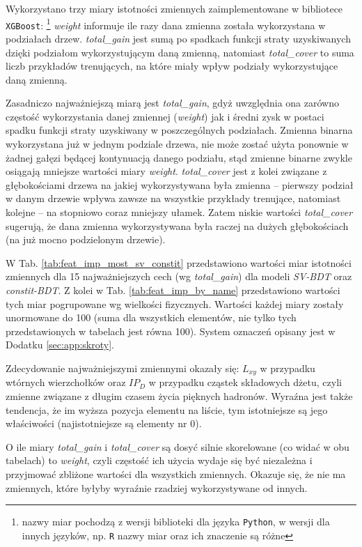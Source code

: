 Wykorzystano trzy miary istotności zmiennych zaimplementowane w bibliotece \texttt{XGBoost}: 
\footnote{nazwy miar pochodzą z wersji biblioteki dla języka \texttt{Python}, w wersji dla innych języków, np. \texttt{R} nazwy miar oraz ich znaczenie są różne} 
\textit{weight} informuje ile razy dana zmienna została wykorzystana w podziałach drzew.  
\textit{total\_gain} jest sumą po spadkach funkcji straty uzyskiwanych dzięki podziałom wykorzystującym daną zmienną, natomiast
\textit{total\_cover} to suma liczb przykładów trenujących, na które miały wpływ podziały wykorzystujące daną zmienną.

Zasadniczo najważniejszą miarą jest \textit{total\_gain}, gdyż uwzględnia ona zarówno częstość wykorzystania danej zmiennej (\textit{weight}) jak i średni zysk w postaci spadku funkcji straty uzyskiwany w poszczególnych podziałach. 
Zmienna binarna wykorzystana już w jednym podziale drzewa, nie może zostać użyta ponownie w żadnej gałęzi będącej kontynuacją danego podziału, stąd zmienne binarne zwykle osiągają mniejsze wartości miary \textit{weight}.
\textit{total\_cover} jest z kolei związane z głębokościami drzewa na jakiej wykorzystywana była zmienna -- pierwszy podział w danym drzewie wpływa zawsze na wszystkie przykłady trenujące, natomiast kolejne -- na stopniowo coraz mniejszy ułamek. Zatem niskie wartości \textit{total\_cover} sugerują, że dana zmienna wykorzystywana była raczej na dużych głębokościach (na już mocno podzielonym drzewie).




\vspace{1em}
W Tab. \ref{tab:feat_imp_most_sv_constit} przedstawiono wartości miar istotności zmiennych dla 15 najważniejszych cech (wg \textit{total\_gain}) dla modeli \textit{SV-BDT} oraz \textit{constit-BDT}. 
Z kolei w Tab. \ref{tab:feat_imp_by_name} przedstawiono wartości tych miar pogrupowane wg wielkości fizycznych.
Wartości każdej miary zostały unormowane do 100 (suma dla wszystkich elementów, nie tylko tych przedstawionych w tabelach jest równa 100). System oznaczeń opisany jest w Dodatku \ref{sec:app:skroty}.

Zdecydowanie najważniejszymi zmiennymi okazały się: $L_{xy}$ w przypadku wtórnych wierzchołków oraz $IP_D$ w przypadku cząstek składowych dżetu, czyli zmienne związane z długim czasem życia pięknych hadronów. 
Wyraźna jest także tendencja, że im wyższa pozycja elementu na liście, tym istotniejsze są jego właściwości (najistotniejsze są elementy nr 0).

O ile miary \textit{total\_gain} i \textit{total\_cover} są dosyć silnie skorelowane (co widać w obu tabelach) to \textit{weight}, czyli częstość ich użycia wydaje się być niezależna i przyjmować zbliżone wartości dla wszystkich zmiennych. 
Okazuje się, że nie ma zmiennych, które byłyby wyraźnie rzadziej wykorzystywane od innych.
 
